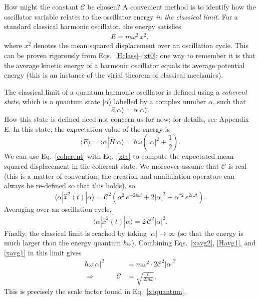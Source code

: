 \documentclass[pra,12pt]{revtex4}
\begin{document}
How might the constant $\mathcal{C}$ be chosen?  A convenient method
is to identify how the oscillator variable relates to the oscillator
energy \textit{in the classical limit}.  For a standard classical
harmonic oscillator, the energy satisfies
\begin{equation}
  E = m\omega^2\, \overline{x^2},
  \label{xavg2}
\end{equation}
where $\overline{x^2}$ denotes the mean squared displacement over an
oscillation cycle.  This can be proven rigorously from
Eqs.~\eqref{Hclass}--\eqref{xt0}; one way to remember it is that the
average kinetic energy of a harmonic oscillator equals its average
potential energy (this is an instance of the virial theorem of
classical mechanics).

The classical limit of a quantum harmonic oscillator is defined using
a \textit{coherent state}, which is a quantum state $|\alpha\rangle$
labelled by a complex number $\alpha$, such that
\begin{equation}
  \hat{a}|\alpha\rangle = \alpha|\alpha\rangle.
  \label{coherent}
\end{equation}
How this state is defined need not concern us for now; for details,
see Appendix E.  In this state, the expectation value of the energy is
\begin{equation}
  \langle E\rangle =
  \langle\alpha|\hat{H}|\alpha\rangle = \hbar \omega \left(|\alpha|^2 + \frac{1}{2}\right).
  \label{Havg1}
\end{equation}
We can use Eq.~\eqref{coherent} with Eq.~\eqref{xtc} to compute the
expectated mean squared displacement in the coherent state.  We
moreover assume that $\mathcal{C}$ is real (this is a matter of
convention; the creation and annihilation operators can always be
re-defined so that this holds), so
\begin{equation}
  \langle\alpha|\hat{x}^2(t)|\alpha\rangle
  = \mathcal{C}^2 \left(\alpha^2 \, e^{-2i\omega t} + 2|\alpha|^2
  + \alpha^{*2} \,e^{2i\omega t} \right).
\end{equation}
Averaging over an oscillation cycle,
\begin{equation}
  \overline{\langle\alpha|\hat{x}^2(t)|\alpha\rangle}
  = 2\, \mathcal{C}^2 |\alpha|^2.
  \label{xavg1}
\end{equation}
Finally, the classical limit is reached by taking $|\alpha|\rightarrow
\infty$ (so that the energy is much larger than the energy quantum
$\hbar\omega$).  Combining Eqs.~\eqref{xavg2}, \eqref{Havg1}, and
\eqref{xavg1} in this limit gives
\begin{align}
  \hbar \omega |\alpha|^2 &= m\omega^2 \cdot 2\mathcal{C}^2|\alpha|^2 \\
  \Rightarrow\qquad\quad \mathcal{C} &= \sqrt{\frac{\hbar}{2m\omega}}.
\end{align}
This is precisely the scale factor found in Eq.~\eqref{xtquantum}.
\end{document}
